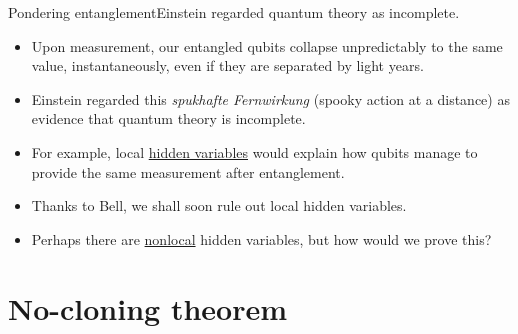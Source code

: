 \begin{frame}{Pondering entanglement}{Einstein regarded quantum theory as incomplete.}

\begin{itemize}
    \item<1-> Upon measurement, our entangled qubits collapse unpredictably to the same value, instantaneously, even if they are separated by light years.
    \item<2-> Einstein regarded this \textit{spukhafte Fernwirkung} (spooky action at a distance) as evidence that quantum theory is incomplete.
    \item<3-> For example, local \href{https://en.wikipedia.org/wiki/Hidden-variable_theory}{hidden variables} would explain how qubits manage to provide the same measurement after entanglement.
    \item<6-> Thanks to Bell, we shall soon rule out local hidden variables.
    \item<7-> Perhaps there are \href{https://en.wikipedia.org/wiki/Principle_of_locality}{nonlocal} hidden variables, but how would we prove this?
\end{itemize}
    
\end{frame}

\section{No-cloning theorem}

